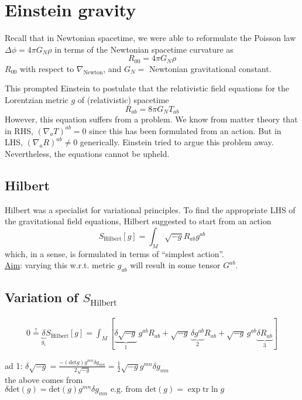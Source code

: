 \section{Einstein gravity}

Recall that in Newtonian spacetime, we were able to reformulate the Poisson law $\Delta \phi = 4\pi G_N \rho$ in terms of the Newtonian spacetime curvature as 
\[
R_{00} = 4\pi G_N \rho
\]
$R_{00}$ with respect to $\nabla_{\text{Newton}}$, and $G_N = $ Newtonian gravitational constant.

This prompted Einstein to postulate that the relativistic field equations for the Lorentzian metric $g$ of (relativistic) spacetime
\[
R_{ab} = 8\pi G_N T_{ab}
\]
However, this equation suffers from a problem. We know from matter theory that in RHS, $(\nabla_a T)^{ab} = 0$ since this has been formulated from an action. But in LHS, $(\nabla_a R)^{ab} \neq 0$ generically. Einstein tried to argue this problem away. Nevertheless, the equations cannot be upheld.

\subsection{Hilbert}
Hilbert was a specialist for variational principles. To find the appropriate LHS of the gravitational field equations, Hilbert suggested to start from an action
\[
S_{\text{Hilbert}}[g] = \int_M \sqrt{-g} R_{ab} g^{ab}
\]
which, in a sense, is formulated in terms of ``simplest action''. \\
\underline{Aim}: varying this w.r.t. metric $g_{ab}$ will result in some tensor $G^{ab}$.

\subsection{Variation of $S_{\text{Hilbert}}$}
\begin{align*}
  0 \overset{!}{=} \underbrace{\delta}_{g_i} S_{\text{Hilbert}}[g] = \int_M [ \underbrace{\delta \sqrt{-g} }_{1} \, g^{ab}R_{ab} + \sqrt{-g} \, \underbrace{\delta g^{ab}}_{2} R_{ab} + \sqrt{-g} \, g^{ab} \underbrace{\delta R_{ab}}_{3} ] 
\end{align*}

ad 1: $\delta \sqrt{-g} = \frac{- (\text{det}g)g^{mn} \delta g_{mn}}{2 \sqrt{-g}} = \frac{1}{2} \sqrt{-g} g^{mn} \delta g_{mn}$ \\
the above comes from $\delta \text{det}(g) = \text{det}(g) g^{mn} \delta g_{mn} \text{  e.g. from } \text{det}(g) = \exp{\text{tr}{\ln{g}}}$


